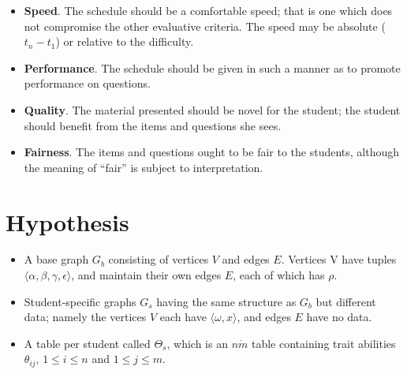 \documentclass{article}
\begin{document}
 \begin{itemize}

   \item \textbf{Speed}. The schedule should be a comfortable speed; that is
   one which does not compromise the other evaluative criteria. The speed may
   be absolute ($t_n - t_1$) or relative to the difficulty. 

   \item \textbf{Performance}. The schedule should be given in such a manner
   as to promote performance on questions.  

   \item \textbf{Quality}. The material presented should be novel for the
   student; the student should benefit from the items and questions she sees.

   \item \textbf{Fairness}. The items and questions ought to be fair to the
   students, although the meaning of ``fair'' is subject to interpretation.

 \end{itemize} 


\section{Hypothesis}

\begin{itemize}

  \item A base graph $G_{b}$ consisting of vertices $V$ and edges $E$.
  Vertices V have tuples $\langle\alpha, \beta, \gamma, \epsilon\rangle$, and
  maintain their own edges $E$, each of which has $\rho$.  

  \item Student-specific graphs $G_{s}$ having the same structure as $G_{b}$
  but different data; namely the vertices $V$ each have $\langle\omega,
  x\rangle$, and edges $E$ have no data.

  \item A table per student called $\Theta_s$, which is an $n \dot m$ table
  containing trait abilities $\theta_{ij}$, $1 \leq i \leq n$ and $1 \leq j
  \leq m$.

\end{itemize}
\end{document}
